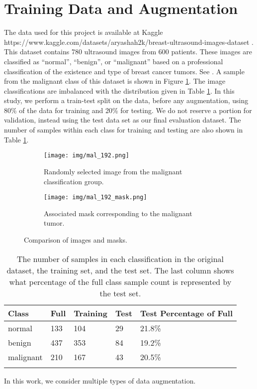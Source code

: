 \documentclass[sn-mathphys,Numbered]{sn-jnl}%
\theoremstyle{thmstyleone}%
\theoremstyle{thmstyletwo}%
\theoremstyle{thmstylethree}%
\begin{document}
\section{Training Data and Augmentation}\label{sec_data}
The data used for this project is available at Kaggle https://www.kaggle.com/datasets/aryashah2k/breast-ultrasound-images-dataset .  This dataset contains 780 ultrasound images from 600 patients.  These images are classified as “normal”, “benign”, or “malignant” based on a professional classification of the existence and type of breast cancer tumors.  See \cite{breast_data}.  A sample from the malignant class of this dataset is shown in Figure \ref{fig:example_mal}.  The image classifications are imbalanced with the distribution given in Table \ref{dataclasses}.  In this study, we perform a train-test split on the data, before any augmentation, using 80\% of the data for training and 20\% for testing.  We do not reserve a portion for validation, instead using the test data set as our final evaluation dataset.  The number of samples within each class for training and testing are also shown in  Table \ref{dataclasses}.

\begin{figure}
  \centering
  \begin{subfigure}[b]{0.4\textwidth}
    \texttt{[image: img/mal\_192.png]}
    \caption{Randomly selected image from the malignant classification group.}
  \end{subfigure}
  \hfill
  \begin{subfigure}[b]{0.4\textwidth}
    \texttt{[image: img/mal\_192\_mask.png]}
    \caption{Associated mask corresponding to the malignant tumor.}
  \end{subfigure}
  \caption{Comparison of images and masks.}
   \label{fig:example_mal}
\end{figure}

\begin{table}[h]
\caption{The number of samples in each classification in the original dataset, the training set, and the test set.  The last column shows what percentage of the full class sample count is represented by the test set.}\label{dataclasses}
\begin{tabular}{@{}lllll@{}}%
\toprule
Class & Full  & Training & Test & Test Percentage of Full\\
\midrule
normal & 133    & 104   & 29 & 21.8\% \\
benign & 437    & 353  & 84 & 19.2\%  \\
malignant & 210    &   167 & 43  & 20.5\%  \\
\botrule
\end{tabular}
\end{table}
In this work, we consider multiple types of data augmentation.  
\end{document}
